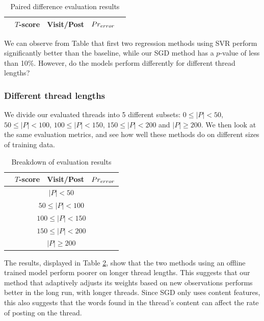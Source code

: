 \begin{table}
	\footnotesize
\begin{center}
\begin{tabular}{| l | c | c | c | l |}
\hline
& $T$-score			   &	Visit/Post & 	$Pr_{error}$ &\\
\hline
	
\hline
\end{tabular}
\end{center}
\caption{Paired difference evaluation results}\label{tbl:diff_eval}
\end{table}

We can observe from Table \label{tbl:diff_eval} that first two regression 
methods using SVR perform significantly better than the baseline, while our SGD 
method has a $p$-value of less than 10\%. However, do the models perform 
differently for different thread lengths?

\subsubsection{Different thread lengths}
We divide our evaluated threads into 5 different subsets: $0 \leq |P| < 50$,
$50 \leq |P| < 100$, $100 \leq |P| < 150$, $150 \leq |P| < 200$ and $|P| \geq 
200$. We then look at the same evaluation metrics, and see how well these 
methods do on different sizes of training data.

\begin{table}
	\footnotesize
\begin{center}
\begin{tabular}{| l | c | c | c|}
\hline
& $T$-score			   &	Visit/Post & 	$Pr_{error}$ \\
\hline
	\multicolumn{4}{|c|}{$|P| < 50$}\\
\hline
	
\hline
	\multicolumn{4}{|c|}{$50 \leq |P| < 100$}\\
\hline
	
\hline
	\multicolumn{4}{|c|}{$100 \leq |P| < 150$}\\
\hline
	
\hline
	\multicolumn{4}{|c|}{$150 \leq |P| < 200$}\\
\hline
	
\hline
	\multicolumn{4}{|c|}{$|P| \geq 200$}\\
\hline
	
\hline
\end{tabular}
\end{center}
\caption{Breakdown of evaluation results}\label{tbl:bin_eval}
\end{table}
The results, displayed in Table \ref{tbl:bin_eval}, show that the two methods 
using an offline trained model perform poorer on longer thread lengths. This 
suggests that our method that adaptively adjusts its weights based on new 
observations performs better in the long run, with longer threads. Since SGD 
only uses content features, this also suggests that the words found in the 
thread's content can affect the rate of posting on the thread.

